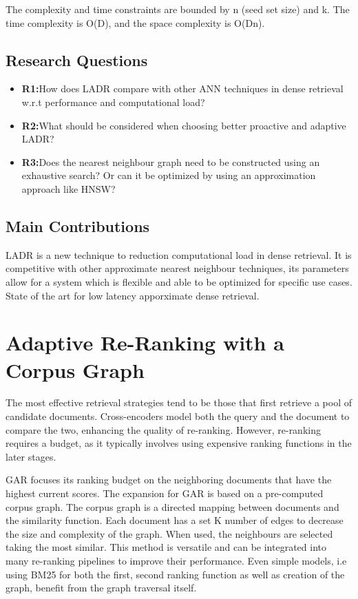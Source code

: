 \documentclass[sigconf,authorversion,nonacm]{acmart}
\begin{document}
The complexity and time constraints are bounded by n (seed set size) and k. The time complexity is O(D), and the space complexity is O(Dn).

\subsection{Research Questions}

\begin{itemize}

	\item \textbf{R1:}How does LADR compare with other ANN techniques in dense retrieval w.r.t
	      performance and computational load?

	\item \textbf{R2:}What should be considered when choosing better proactive and adaptive LADR?

	\item \textbf{R3:}Does the nearest neighbour graph need to be constructed using an exhaustive
	      search? Or can it be optimized by using an approximation approach like HNSW?

\end{itemize}


\subsection{Main Contributions}

LADR is a new technique to reduction computational load in dense retrieval. It is competitive with
other approximate nearest neighbour techniques, its parameters allow for a system which is flexible
and able to be optimized for specific use cases. State of the art for low latency apporximate dense
retrieval.

\section{Adaptive Re-Ranking with a Corpus Graph}

The most effective retrieval strategies tend to be those that first retrieve a pool of candidate
documents. Cross-encoders model both the query and the document to compare the two, enhancing the
quality of re-ranking. However, re-ranking requires a budget, as it typically involves using
expensive ranking functions in the later stages.

GAR focuses its ranking budget on the neighboring documents that have the highest current scores.
The expansion for GAR is based on a pre-computed corpus graph. The corpus graph is a directed
mapping between documents and the similarity function. Each document has a set K number of edges to
decrease the size and complexity of the graph. When used, the neighbours are selected taking the
most similar. This method is versatile and can be integrated into many re-ranking pipelines to
improve their performance. Even simple models, i.e using BM25 for both the first, second ranking
function as well as creation of the graph, benefit from the graph traversal itself.
\end{document}
